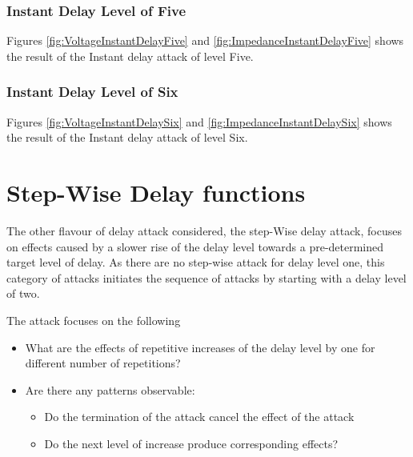 \subsubsection{Instant Delay Level of Five}
Figures \ref{fig:VoltageInstantDelayFive} and \ref{fig:ImpedanceInstantDelayFive} shows the result of the Instant delay attack of level Five. 

\subsubsection{Instant Delay Level of Six}
Figures \ref{fig:VoltageInstantDelaySix} and \ref{fig:ImpedanceInstantDelaySix} shows the result of the Instant delay attack of level Six. 








\newpage
\section{Step-Wise Delay functions}
The other flavour of delay attack considered, the step-Wise delay attack, focuses on effects caused by a slower rise of the delay level towards a pre-determined target level of delay. As there are no step-wise attack for delay level one, this category of attacks initiates the sequence of attacks by starting with a delay level of two.

The attack focuses on the following 
\begin{itemize}
\item What are the effects of repetitive increases of the delay level by one for different number of repetitions?
\item Are there any patterns observable:
\begin{itemize}
    \item Do the termination of the attack cancel the effect of the attack
    \item Do the next level of increase produce corresponding effects? 
\end{itemize}

\end{itemize}

















